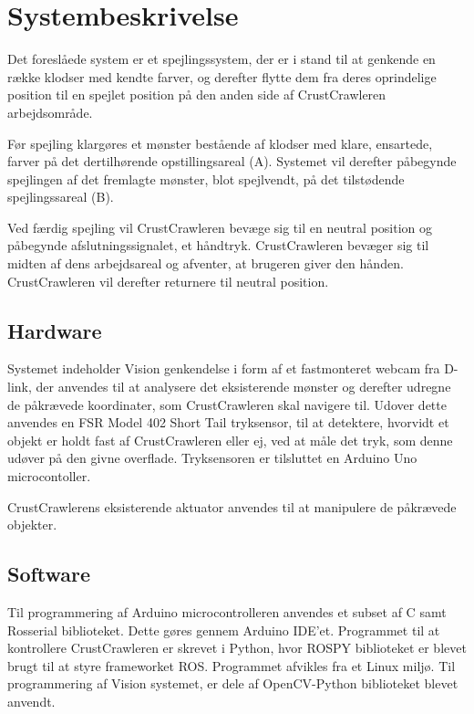 \chapter{Systembeskrivelse}\label{chap:Systembeskrivelse}
Det foreslåede system er et spejlingssystem, der er i stand til at genkende en række klodser med kendte farver, og derefter flytte dem fra deres oprindelige position til en spejlet position på den anden side af CrustCrawleren arbejdsområde. 

Før spejling klargøres et mønster bestående af klodser med klare, ensartede, farver på det dertilhørende opstillingsareal (A).
Systemet vil derefter påbegynde spejlingen af det fremlagte mønster, blot spejlvendt, på det tilstødende spejlingssareal (B).

Ved færdig spejling vil CrustCrawleren bevæge sig til en neutral position og påbegynde afslutningssignalet, et håndtryk.
CrustCrawleren bevæger sig til midten af dens arbejdsareal og afventer, at brugeren giver den hånden.
CrustCrawleren vil derefter returnere til neutral position.
\newpage

\section{Hardware}\label{sec:Hardware}
Systemet indeholder Vision genkendelse i form af et fastmonteret webcam fra D-link, der anvendes til at analysere det eksisterende mønster og derefter udregne de påkrævede koordinater, som CrustCrawleren skal navigere til. 
Udover dette anvendes en FSR\textsuperscript{\textregistered} Model 402 Short Tail tryksensor, til at detektere, hvorvidt et objekt er holdt fast af CrustCrawleren eller ej, ved at måle det tryk, som denne udøver på den givne overflade.
Tryksensoren er tilsluttet en Arduino Uno microcontoller.

CrustCrawlerens eksisterende aktuator anvendes til at manipulere de påkrævede objekter.

\section{Software}\label{sec:Software}
Til programmering af Arduino microcontrolleren anvendes et subset af C samt Rosserial biblioteket.
Dette gøres gennem Arduino IDE'et.
Programmet til at kontrollere CrustCrawleren er skrevet i Python, hvor ROSPY biblioteket er blevet brugt til at styre frameworket ROS.
Programmet afvikles fra et Linux miljø.
Til programmering af Vision systemet, er dele af OpenCV-Python biblioteket blevet anvendt. 